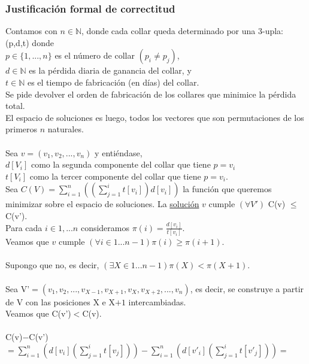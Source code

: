 \documentclass[11pt, a4paper, twoside]{article}
\begin{document}
\subsubsection{Justificación formal de correctitud}

Contamos con $n \in \mathbb{N}$, donde cada collar queda determinado por una $3$-upla: (p,d,t) donde \\
$p \in \{1,...,n\}$ es el número de collar $(p_i \neq p_j)$, \\
$d \in \mathbb{N}$ es la pérdida diaria de ganancia del collar, y \\
$t \in \mathbb{N}$ es el tiempo de fabricación (en días) del collar. \\
Se pide devolver el orden de fabricación de los collares que minimice la pérdida total. \\
El espacio de soluciones es luego, todos los vectores que son permutaciones de los primeros $n$ naturales. \\
\\
Sea $v = (v_1,v_2,...,v_n)$ y entiéndase, \\
$d[V_i]$ como la segunda componente del collar que tiene $p=v_i$ \\
$t[V_i]$ como la tercer componente del collar que tiene $p=v_i$. \\
Sea $\displaystyle{C(V)= \sum_{i=1}^{n} ((\sum_{j=1}^{i} t[v_i])d[v_i])}$ la función que queremos minimizar sobre el espacio de soluciones. La \underline{solución} $v$ cumple $(\forall V')$ C(v) $\le$ C(v').\\
Para cada $i \in 1,...n$ consideramos $\displaystyle{ \pi(i)= \frac{d[v_i]}{t[v_i]}}$. \\
Veamos que $v$ cumple $\displaystyle{(\forall i \in 1...n-1) \pi(i) \ge \pi(i+1)}$. \\
\\
Supongo que no, es decir, $\displaystyle{(\exists X \in 1...n-1) \pi(X) < \pi(X+1)}$. \\
\\
Sea V'$=(v_1,v_2,...,v_{X-1},v_{X+1},v_X,v_{X+2},...,v_n)$, es decir, se construye a partir de V con las posiciones X e X$+1$ intercambiadas. \\
Veamos que C(v')$<$C(v). \\
\\
C(v)$-$C(v')$= \displaystyle {\sum_{i=1}^{n} (d[v_i](\sum_{j=1}^{i} t[v_j]))- \sum_{i=1}^{n}(d[v'_i](\sum_{j=1}^{i} t[v'_j]))} = $\\
\end{document}
